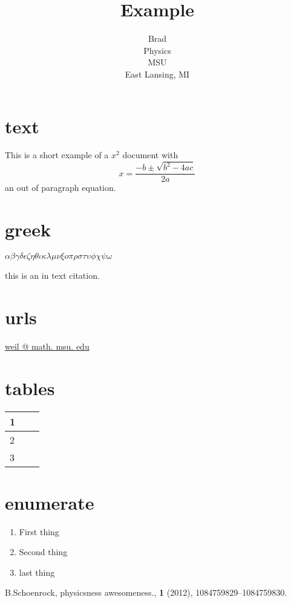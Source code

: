 \documentclass{article}
\author{Brad\\Physics\\MSU\\East Lansing, MI}
\title{Example}
\date{}
\begin{document}
\maketitle
\section{text}
This is a short example of a $x^{2}$ document with $$x=\frac{-b\pm\sqrt{b^{2}-4ac}}{2a}$$ an out of paragraph equation.

\section{greek}
$\alpha \beta \gamma \delta \epsilon \zeta \eta \theta \iota \kappa \lambda \mu \nu \xi o \pi \rho \sigma \tau \upsilon \phi \chi \psi \omega$



this is an in text citation. \cite{thingy}

\section{urls}
\url{weil @ math. msu. edu}

\section{tables}
\begin{tabular}{l|c|r}
\hline 1\\
\hline 2\\
\hline 3\\
\end{tabular}

\section{enumerate}
\begin{enumerate}
\item First thing
\item Second thing
\item last thing
\end{enumerate}

\begin{thebibliography}{9}
 B.Schoenrock, physicsness awesomeness., \textbf{1} (2012), 1084759829--1084759830.

\end{thebibliography}
\end{document}
